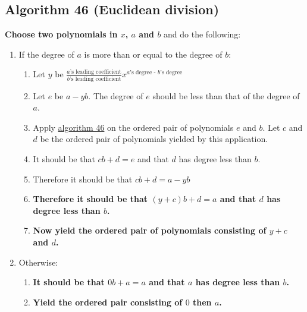 \documentclass[twocolumn]{article}
\begin{document}
		\subsection{Algorithm 46 (Euclidean division)}\label{sec:algorithm 46}
			\textbf{Choose two polynomials in $x$, $a$ and $b$} and do the following:
			\begin{enumerate}
				\item If the degree of $a$ is more than or equal to the degree of $b$:
				\begin{enumerate}
					\item Let $y$ be $\frac{\text{$a$'s leading coefficient}}{\text{$b$'s leading coefficient}}x^{\text{$a$'s degree - $b$'s degree}}$
					\item Let $e$ be $a-yb$. The degree of $e$ should be less than that of the degree of $a$.
					\item Apply \hyperref[sec:algorithm 46]{algorithm 46} on the ordered pair of polynomials $e$ and $b$. Let $c$ and $d$ be the ordered pair of polynomials yielded by this application.
					\item It should be that $cb+d=e$ and that $d$ has degree less than $b$.
					\item Therefore it should be that $cb+d=a-yb$
					\item \textbf{Therefore it should be that $(y+c)b+d=a$ and that $d$ has degree less than $b$.}
					\item \textbf{Now yield the ordered pair of polynomials consisting of $y+c$  and $d$.}
				\end{enumerate}
				\item Otherwise:
				\begin{enumerate}
					\item \textbf{It should be that $0b+a=a$ and that $a$ has degree less than $b$.}
					\item \textbf{Yield the ordered pair consisting of $0$ then $a$.}
				\end{enumerate}
			\end{enumerate}
\end{document}
